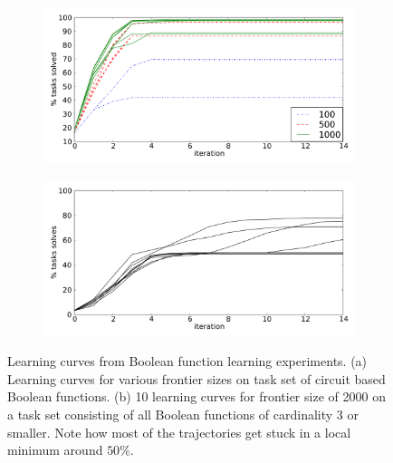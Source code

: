 \documentclass{article}
\begin{document}
\vspace{-.3cm}
\begin{figure}[h]
\begin{subfigure}{.1\linewidth}
\caption{\label{fig:boolLearningCurvesCircuits} }
\end{subfigure}
\begin{subfigure}[Before]{0.9\linewidth}
\includegraphics[width=1.0\linewidth]{figures/booleancircuits3frontiers.pdf}
\end{subfigure}

\vspace{-.32cm}
\begin{subfigure}{.1\linewidth}
\caption{\label{fig:boolLearningCurvesUniform}}
\end{subfigure}
\begin{subfigure}[After]{.9\linewidth}
\includegraphics[width=1.0\linewidth]{figures/booleanfunctionsUniform.pdf}

\end{subfigure}
\caption{Learning curves from Boolean function learning
  experiments. (a) Learning curves for various frontier sizes on task
  set of circuit based Boolean functions. (b) 10
  learning curves for frontier size of 2000 on a task set consisting
  of all Boolean functions of cardinality 3 or smaller. Note how most
  of the trajectories get stuck in a local minimum around
  $50\%$.\label{fig:boolLearningCurves}}
\end{figure}
\end{document}
